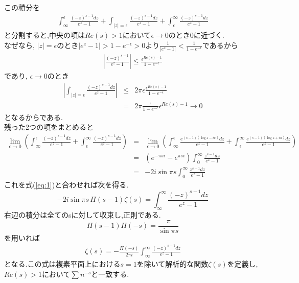 この積分を
\begin{align}
\int_{\infty}^\epsilon \frac{(-z)^{s-1}dz}{e^z-1}+\int_{|z|=\epsilon} \frac{(-z)^{s-1}dz}{e^z-1}+\int_\epsilon^{\infty} \frac{(-z)^{s-1}dz}{e^z-1}\label{eq:2}
\end{align}
と分割すると,中央の項は$Re(s)>1$において$\epsilon\to0$のとき0に近づく.\\
なぜなら, $|z|=\epsilon$のとき$|e^z-1|>1-e^{-\epsilon}>0$より$\frac{1}{|e^z-1|}<\frac{1}{1-e^{-\epsilon}}$であるから
\begin{eqnarray*}
\left|\frac{(-z)^{s-1}}{e^z-1}\right| \le \frac{\epsilon^{Re(s)-1}}{1-e^{-\epsilon}}
\end{eqnarray*}
であり, $\epsilon\to0$のとき
\begin{eqnarray*}
\left|\int_{|z|=\epsilon} \frac{(-z)^{s-1}dz}{e^z-1}\right| &\le& 2\pi\epsilon \frac{\epsilon^{Re(s)-1}}{1-e^{-\epsilon}}\\
&=& 2\pi\frac{\epsilon}{1-e^{-\epsilon}}\epsilon^{Re(s)-1}\to0
\end{eqnarray*}
となるからである.\\
残った2つの項をまとめると
\begin{eqnarray*}
\lim_{\epsilon \to 0}\left(\int_{\infty}^\epsilon \frac{(-z)^{s-1}dz}{e^z-1}+\int_\epsilon^{\infty} \frac{(-z)^{s-1}dz}{e^z-1}\right) &=& \lim_{\epsilon \to 0}\left(\int_{\infty}^\epsilon \frac{e^{(s-1)(\log z-i\pi)}dz}{e^z-1}+\int_\epsilon^{\infty} \frac{e^{(s-1)(\log z+i\pi)}dz}{e^z-1}\right)\\
&=& (e^{-\pi si}-e^{\pi si}) \int_0^\infty \frac{z^{s-1}dz}{e^z-1}\\
&=& -2i\sin{\pi s}\int_0^\infty \frac{z^{s-1}dz}{e^z-1}
\end{eqnarray*}
これを式(\ref{eq:1})と合わせれば次を得る.
\[
-2i\sin{\pi s}\,\Pi(s-1)\zeta(s)=\int_\infty^\infty \frac{(-z)^{s-1}dz}{e^z-1}
\]
右辺の積分は全てのsに対して収束し,正則である.\\
\[
\Pi(s-1)\Pi(-s)=\frac{\pi}{\sin{\pi s}}
\]
を用いれば
\begin{align}
\zeta(s)=-\frac{\Pi(-s)}{2\pi i}\int_{\infty}^{\infty} \frac{(-z)^{s-1}dz}{e^z-1}\label{eq:3}
\end{align}
となる.この式は複素平面上における$s=1$を除いて解析的な関数$\zeta(s)$を定義し, $Re(s)>1$において$\sum n^{-s}$と一致する.\\

